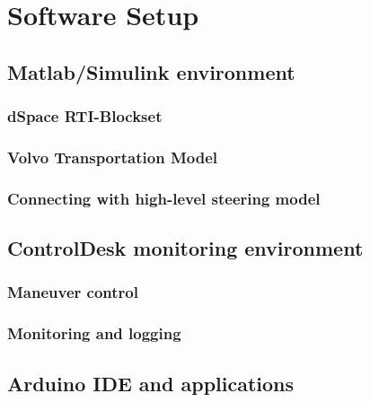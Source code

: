 \documentclass[ExampleMasters.tex]{subfiles}
\begin{document}
\clearpage


\chapter{Software Setup}
\label{chap:software_setup}
\section{Matlab/Simulink environment}
\label{sec:matlab}
\subsection{dSpace RTI-Blockset}
\subsection{Volvo Transportation Model}
\subsection{Connecting with high-level steering model}
\section{ControlDesk monitoring environment}
\label{sec:control_desk}
\subsection{Maneuver control}
\subsection{Monitoring and logging}

\section{Arduino IDE and applications}
\label{sec:arduino_applications}
\end{document}
